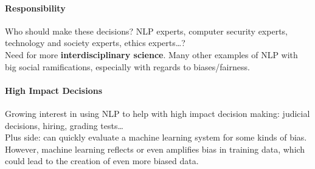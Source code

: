 \documentclass[10pt]{report}
\begin{document}
\paragraph{Responsibility} Who should make these decisions? NLP experts, computer security experts, technology and society experts, ethics experts\ldots?\\
Need for more \textbf{interdisciplinary science}. Many other examples of NLP with big social ramifications, especially with regards to biases/fairness.
\paragraph{High Impact Decisions} Growing interest in using NLP to help with high impact decision making: judicial decisions, hiring, grading tests\ldots\\
Plus side: can quickly evaluate a machine learning system for some kinds of bias. However, machine learning reflects or even amplifies bias in training data, which could lead to the creation of even more biased data.
\pagebreak
\end{document}
